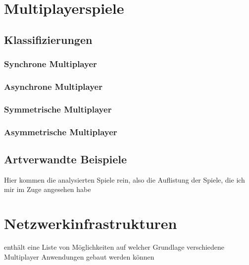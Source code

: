 

\section{Multiplayerspiele}

\subsection{Klassifizierungen}

\subsubsection{Synchrone Multiplayer}

\subsubsection{Asynchrone Multiplayer}

\subsubsection{Symmetrische Multiplayer}

\subsubsection{Asymmetrische Multiplayer}

\subsection{Artverwandte Beispiele}
Hier kommen die analysierten Spiele rein, also die Auflistung der Spiele, die ich mir im Zuge angesehen habe

\section{Netzwerkinfrastrukturen}

enthält eine Liste von Möglichkeiten auf welcher Grundlage verschiedene Multiplayer Anwendungen gebaut werden können


